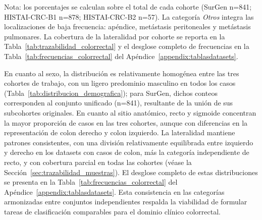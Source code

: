 \begin{table}[htbp]
\centering
\caption{Variables objetivo del dominio colorrectal: categorías retenidas y clases minoritarias tras la curación.}
\label{tab:resumen_frecuencias_colorrectal}
\small
{}

\vspace{4pt}
Nota: los porcentajes se calculan sobre el total de cada cohorte (SurGen n=841; HISTAI-CRC-B1 n=878; HISTAI-CRC-B2 n=57). La categoría \textit{Otros} integra las localizaciones de baja frecuencia: apéndice, metástasis peritoneales y metástasis pulmonares. La cobertura de la lateralidad por cohorte se reporta en la Tabla~\ref{tab:trazabilidad_colorrectal} y el desglose completo de frecuencias en la Tabla~\ref{tab:frecuencias_colorrectal} del Apéndice~\ref{appendix:tablasdatasets}.
\end{table}

En cuanto al sexo, la distribución es relativamente homogénea entre las tres cohortes de trabajo, con un ligero predominio masculino en todos los casos (Tabla~\ref{tab:distribucion_demografica}); para SurGen, dichos conteos corresponden al conjunto unificado (n=841), resultante de la unión de sus subcohortes originales. En cuanto al sitio anatómico, recto y sigmoide concentran la mayor proporción de casos en las tres cohortes, aunque con diferencias en la representación de colon derecho y colon izquierdo. La lateralidad mantiene patrones consistentes, con una división relativamente equilibrada entre izquierdo y derecho en los datasets con casos de colon, más la categoría independiente de recto, y con cobertura parcial en todas las cohortes (véase la Sección~\ref{sec:trazabilidad_muestras}). El desglose completo de estas distribuciones se presenta en la Tabla~\ref{tab:frecuencias_colorrectal} del Apéndice~\ref{appendix:tablasdatasets}. Esta consistencia en las categorías armonizadas entre conjuntos independientes respalda la viabilidad de formular tareas de clasificación comparables para el dominio clínico colorrectal.

